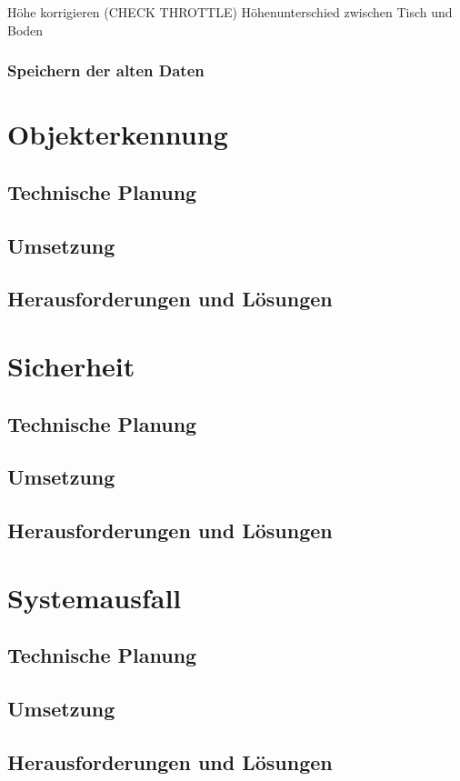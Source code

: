     Höhe korrigieren (CHECK THROTTLE)
    Höhenunterschied zwischen Tisch und Boden

    \subsubsection{Speichern der alten Daten}


\section{Objekterkennung}

  \subsection{Technische Planung}

  \subsection{Umsetzung}

  \subsection{Herausforderungen und Lösungen}

\section{Sicherheit}

  \subsection{Technische Planung}

  \subsection{Umsetzung}

  \subsection{Herausforderungen und Lösungen}

\section{Systemausfall}

  \subsection{Technische Planung}

  \subsection{Umsetzung}

  \subsection{Herausforderungen und Lösungen}

